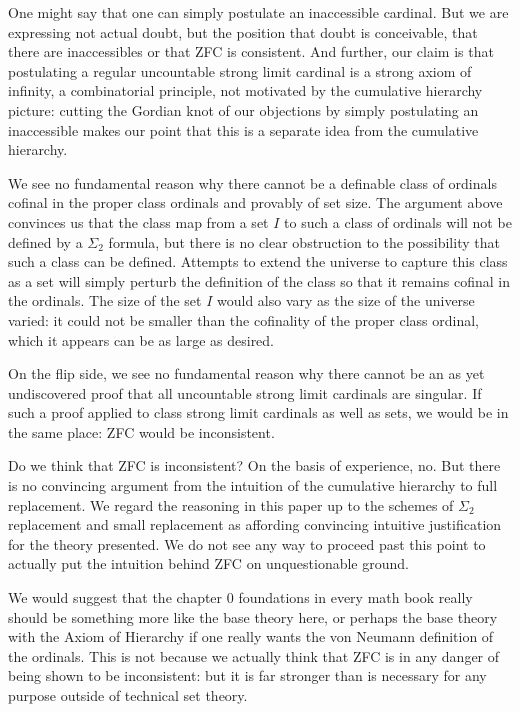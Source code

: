 \documentclass[12pt]{article}
\begin{document}
One might say that one can simply postulate an inaccessible cardinal.  But we are expressing not actual doubt, but the position that doubt is conceivable, that there are inaccessibles or that ZFC is consistent.  And further, our claim is that postulating a regular uncountable strong limit cardinal is a strong axiom of infinity, a combinatorial principle, not motivated by the cumulative hierarchy picture:  cutting the Gordian knot of our objections by simply postulating an inaccessible makes our point that this is a separate idea from the cumulative hierarchy.

We see no fundamental reason why there cannot be a definable class of ordinals cofinal in the proper class ordinals and provably of set size.  The argument above convinces us that the class map from a set $I$ to such a class of ordinals will not be defined by a $\Sigma_2$ formula, but there is no clear obstruction to the possibility that such a class can be defined.  Attempts to extend the universe to capture this class as a set will simply perturb the definition of the class so that it remains cofinal in the ordinals.   The size of the set $I$ would also vary as the size of the universe varied:  it could not be smaller than the cofinality of the proper class ordinal, which it appears can be as large as desired.

On the flip side, we see no fundamental reason why there cannot be an as yet undiscovered proof that all uncountable strong limit cardinals are singular.  If such a  proof applied to class strong limit cardinals as well as sets, we would be in the same place:  ZFC would be inconsistent.

Do we think that ZFC is inconsistent?  On the basis of experience, no.  But there is no convincing argument from the intuition of the cumulative hierarchy to full replacement.  We regard the reasoning in this paper up to the schemes of $\Sigma_2$ replacement and small replacement as affording convincing intuitive justification for the theory presented.  We do not see any way to proceed past this point to actually put the intuition behind ZFC on unquestionable ground.

We would suggest that the chapter 0 foundations in every math book really should be something more like the base theory here, or perhaps the base theory with the Axiom of Hierarchy if one really wants the von Neumann definition of the ordinals.  This is not because we actually think that ZFC is in any danger of being shown to be inconsistent:  but it is far stronger than is necessary for any purpose outside of technical set theory.   
\end{document}
